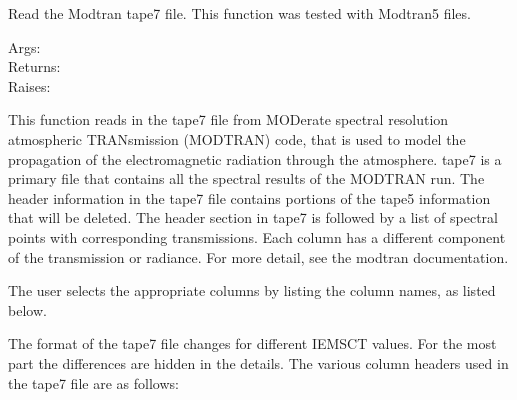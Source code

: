 \documentclass[a4paper,10pt,english]{sphinxmanual}
\begin{document}
\begin{fulllineitems}
\label{rymodtran:pyradi.rymodtran.loadtape7}
Read the Modtran tape7 file. This function was tested with Modtran5 files.
\begin{description}
\item[{Args:}] \leavevmode
{}

\item[{Returns:}] \leavevmode
{}

\item[{Raises:}] \leavevmode
{}

\end{description}

This function reads in the tape7 file from MODerate spectral resolution
atmospheric TRANsmission (MODTRAN) code, that is used to model the
propagation of the electromagnetic radiation through the atmosphere. tape7
is a primary file that contains all the spectral results of the MODTRAN
run. The header information in the tape7 file contains portions of the
tape5 information that will be deleted. The header section in tape7 is
followed by a list of spectral points with corresponding transmissions.
Each column has a different component of the transmission or radiance. 
For more detail, see the modtran documentation.

The user selects the appropriate columns by listing the column names, as
listed below.

The format of the tape7 file changes for different IEMSCT values. For
the most part the differences are hidden in the details.  
The various column headers used in the tape7 file are as follows:


\end{fulllineitems}
\end{document}
